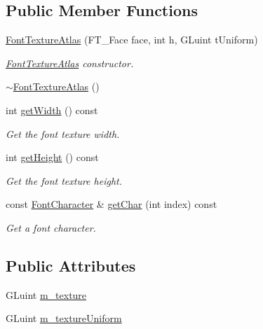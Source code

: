 \subsection*{Public Member Functions}
\begin{DoxyCompactItemize}
\item 
\mbox{\hyperlink{classec_1_1_font_texture_atlas_abf42f99b2562130eb9b347c895cf14f3}{Font\+Texture\+Atlas}} (F\+T\+\_\+\+Face face, int h, G\+Luint t\+Uniform)
\begin{DoxyCompactList}\small\item\em \mbox{\hyperlink{classec_1_1_font_texture_atlas}{Font\+Texture\+Atlas}} constructor. \end{DoxyCompactList}\item 
\mbox{\hyperlink{classec_1_1_font_texture_atlas_a9e520505ca5bd5b9cabe27448d285449}{$\sim$\+Font\+Texture\+Atlas}} ()
\item 
int \mbox{\hyperlink{classec_1_1_font_texture_atlas_a9259106785594dcf52a86120faf2abdf}{get\+Width}} () const
\begin{DoxyCompactList}\small\item\em Get the font texture width. \end{DoxyCompactList}\item 
int \mbox{\hyperlink{classec_1_1_font_texture_atlas_aa6e4a6f124b7fed58783c48c78300244}{get\+Height}} () const
\begin{DoxyCompactList}\small\item\em Get the font texture height. \end{DoxyCompactList}\item 
const \mbox{\hyperlink{structec_1_1_font_character}{Font\+Character}} \& \mbox{\hyperlink{classec_1_1_font_texture_atlas_a4587f2074d6295364a6ab7bac4a5846d}{get\+Char}} (int index) const
\begin{DoxyCompactList}\small\item\em Get a font character. \end{DoxyCompactList}\end{DoxyCompactItemize}
\subsection*{Public Attributes}
\begin{DoxyCompactItemize}
\item 
G\+Luint \mbox{\hyperlink{classec_1_1_font_texture_atlas_a97620bab980c2f73e90928c1c9ec405a}{m\+\_\+texture}}
\item 
G\+Luint \mbox{\hyperlink{classec_1_1_font_texture_atlas_a0ad591b30c2e288d31f4ab9e18acb887}{m\+\_\+texture\+Uniform}}
\end{DoxyCompactItemize}



